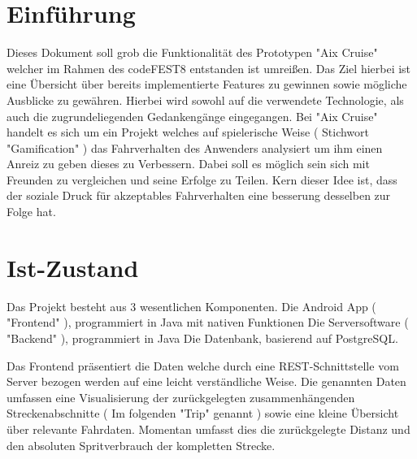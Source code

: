 \documentclass[12pt,a4paper,bibliography=totocnumbered,listof=totocnumbered]{scrartcl}
\begin{document}
\setcounter{page}{1}
\onehalfspacing
{}


\section{Einführung}
Dieses Dokument soll grob die Funktionalität des Prototypen "Aix Cruise" welcher im Rahmen des codeFEST8 entstanden ist umreißen. Das Ziel hierbei ist eine Übersicht über bereits implementierte Features zu gewinnen sowie mögliche Ausblicke zu gewähren. Hierbei wird sowohl auf die verwendete Technologie, als auch die zugrundeliegenden Gedankengänge eingegangen.
Bei "Aix Cruise" handelt es sich um ein Projekt welches auf spielerische Weise ( Stichwort "Gamification" ) das Fahrverhalten des Anwenders analysiert um ihm einen Anreiz zu geben dieses zu Verbessern. 
Dabei soll es möglich sein sich mit Freunden zu vergleichen und seine Erfolge zu Teilen. Kern dieser Idee ist, dass der soziale Druck für akzeptables Fahrverhalten eine besserung desselben zur Folge hat.

\section{Ist-Zustand}
Das Projekt besteht aus 3 wesentlichen Komponenten.
Die Android App ( "Frontend" ), programmiert in Java mit nativen Funktionen
Die Serversoftware ( "Backend" ), programmiert in Java
Die Datenbank, basierend auf PostgreSQL.

Das Frontend präsentiert die Daten welche durch eine REST-Schnittstelle vom Server bezogen werden auf eine leicht verständliche Weise.
Die genannten Daten umfassen eine Visualisierung der zurückgelegten zusammenhängenden Streckenabschnitte ( Im folgenden "Trip" genannt ) sowie eine kleine Übersicht über relevante Fahrdaten. Momentan umfasst dies die zurückgelegte Distanz und den absoluten Spritverbrauch der kompletten Strecke.
\end{document}
